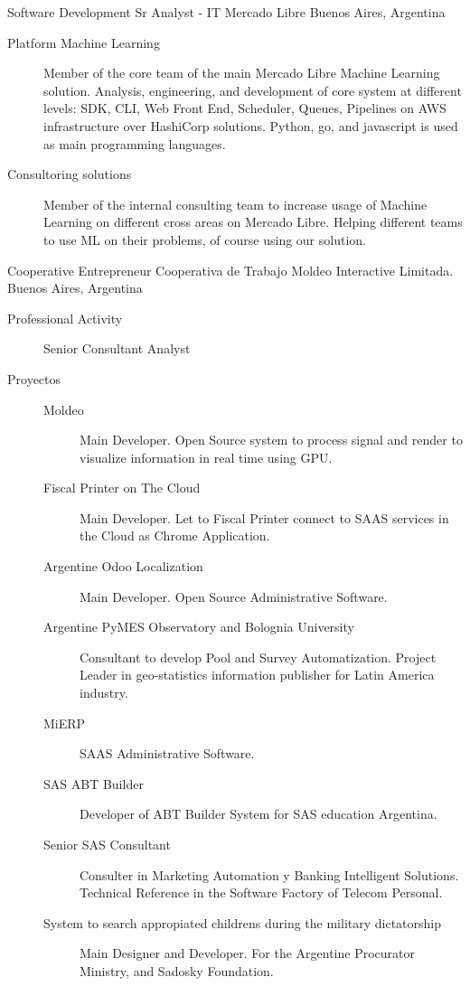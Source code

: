 \documentclass[9pt,a4paper,sans]{moderncv}
\begin{document}
	{Software Development Sr Analyst - IT}
	{Mercado Libre}
	{Buenos Aires, Argentina}
	{}
	{\begin{description}
	 \item [Platform Machine Learning] Member of the core team of the main Mercado Libre Machine Learning solution. Analysis, engineering, and development of core system at different levels: SDK, CLI, Web Front End, Scheduler, Queues, Pipelines on AWS infrastructure over HashiCorp solutions. Python, go, and javascript is used as main programming languages.
	 \item [Consultoring solutions] Member of the internal consulting team to increase usage of Machine Learning on different cross areas on Mercado Libre. Helping different teams to use ML on their problems, of course using our solution.
	\end{description}}
	{Cooperative Entrepreneur}
	{Cooperativa de Trabajo Moldeo Interactive Limitada.}
	{Buenos Aires, Argentina}
	{}
	{\begin{description}
	\item [Professional Activity] Senior Consultant Analyst
	\item [Proyectos]
	\begin{description}
		\item [Moldeo] Main Developer. Open Source system to process signal and render to visualize information in real time using GPU.
		\item [Fiscal Printer on The Cloud] Main Developer. Let to Fiscal Printer connect to SAAS services in the Cloud as Chrome Application.
		\item [Argentine Odoo Localization] Main Developer. Open Source Administrative Software.
		\item [Argentine PyMES Observatory and Bolognia University] Consultant to develop Pool and Survey Automatization. Project Leader in geo-statistics information publisher for Latin America industry.
		\item [MiERP] SAAS Administrative Software.
		\item [SAS ABT Builder] Developer of ABT Builder System for SAS education Argentina.
		\item [Senior SAS Consultant] Consulter in Marketing Automation y Banking Intelligent Solutions. Technical Reference in the Software Factory of Telecom Personal.
		\item [System to search appropiated childrens during the military dictatorship] Main Designer and Developer. For the Argentine Procurator Ministry, and Sadosky Foundation.
	\end{description}
	\end{description}}
\end{document}
